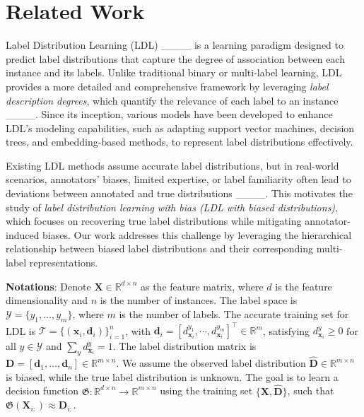 \section{Related Work}
Label Distribution Learning (LDL) ____ is a learning paradigm designed to predict label distributions that capture the degree of association between each instance and its labels. Unlike traditional binary or multi-label learning, LDL provides a more detailed and comprehensive framework by leveraging \textit{label description degrees}, which quantify the relevance of each label to an instance ____. Since its inception, various models have been developed to enhance LDL’s modeling capabilities, such as adapting support vector machines, decision trees, and embedding-based methods, to represent label distributions effectively.

Existing LDL methods assume accurate label distributions, but in real-world scenarios, annotators’ biases, limited expertise, or label familiarity often lead to deviations between annotated and true distributions ____. This motivates the study of \textit{label distribution learning with bias (LDL with biased distributions)}, which focuses on recovering true label distributions while mitigating annotator-induced biases. Our work addresses this challenge by leveraging the hierarchical relationship between biased label distributions and their corresponding multi-label representations.

\textbf{Notations}: Denote \(\mathbf{X} \in \mathbb{R}^{d \times n}\) as the feature matrix, where \(d\) is the feature dimensionality and \(n\) is the number of instances. The label space is \(\mathcal{Y} = \{y_1,\ldots, y_m\}\), where \(m\) is the number of labels. The accurate training set for LDL is \(\mathcal{T} = \{(\mathbf{x}_i, \mathbf{d}_i)\}_{i=1}^n\), with \(\mathbf{d}_i = [d_{\mathbf{x}_i}^{y_1}, \cdots, d_{\mathbf{x}_i}^{y_m}]^\top \in \mathbb{R}^m\), satisfying \(d_{\mathbf{x}_i}^y \geq 0\) for all \(y \in \mathcal{Y}\) and \(\sum_{y} d_{\mathbf{x}_i}^y = 1\). The label distribution matrix is \(\mathbf{D} = [\mathbf{d}_1,\ldots, \mathbf{d}_n] \in \mathbb{R}^{m \times n}\). We assume the observed label distribution \(\hat{\mathbf{D}} \in \mathbb{R}^{m \times n}\) is biased, while the true label distribution is unknown. The goal is to learn a decision function \(\mathfrak{G}: \mathbb{R}^{d \times n} \to \mathbb{R}^{m\times n}\) using the training set \(\{\mathbf{X}, \hat{\mathbf{D}}\}\), such that \(\mathfrak{G}(\mathbf{X}_{i:}) \approx {\mathbf{D}}_{i:}\).
